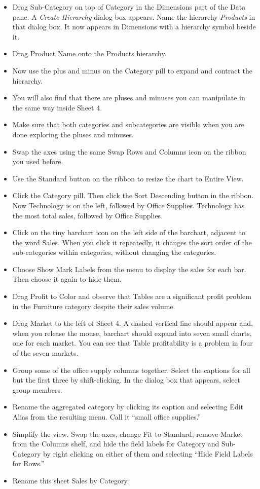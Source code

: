 \begin{itemize}
\tightlist
\item
  Drag Sub-Category on top of Category in the Dimensions part of the
  Data pane. A \emph{Create Hierarchy} dialog box appears. Name the
  hierarchy \emph{Products} in that dialog box. It now appears in
  Dimensions with a hierarchy symbol beside it.
\item
  Drag Product Name onto the Products hierarchy.
\item
  Now use the plus and minus on the Category pill to expand and contract
  the hierarchy.
\item
  You will also find that there are pluses and minuses you can
  manipulate in the same way inside Sheet 4.
\item
  Make sure that both categories and subcategories are visible when you
  are done exploring the pluses and minuses.
\item
  Swap the axes using the same Swap Rows and Columns icon on the ribbon
  you used before.
\item
  Use the Standard button on the ribbon to resize the chart to Entire
  View.
\item
  Click the Category pill. Then click the Sort Descending button in the
  ribbon. Now Technology is on the left, followed by Office Supplies.
  Technology has the most total sales, followed by Office Supplies.
\item
  Click on the tiny barchart icon on the left side of the barchart,
  adjacent to the word Sales. When you click it repeatedly, it changes
  the sort order of the sub-categories within categories, without
  changing the categories.
\item
  Choose Show Mark Labels from the menu to display the sales for each
  bar. Then choose it again to hide them.
\item
  Drag Profit to Color and observe that Tables are a significant profit
  problem in the Furniture category despite their sales volume.
\item
  Drag Market to the left of Sheet 4. A dashed vertical line should
  appear and, when you release the mouse, barchart should expand into
  seven small charts, one for each market. You can see that Table
  profitability is a problem in four of the seven markets.
\item
  Group some of the office supply columns together. Select the captions
  for all but the first three by shift-clicking. In the dialog box that
  appears, select group members.
\item
  Rename the aggregated category by clicking its caption and selecting
  Edit Alias from the resulting menu. Call it ``small office supplies.''
\item
  Simplify the view. Swap the axes, change Fit to Standard, remove
  Market from the Columns shelf, and hide the field labels for Category
  and Sub-Category by right clicking on either of them and selecting
  ``Hide Field Labels for Rows.''
\item
  Rename this sheet Sales by Category.
\end{itemize}

